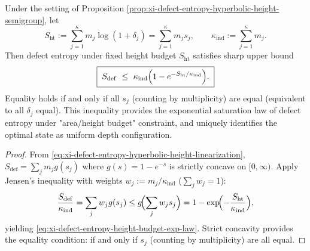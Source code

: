 \begin{corollary}\label{cor:xi-defect-entropy-height-budget-exponential-law}
Under the setting of Proposition \ref{prop:xi-defect-entropy-hyperbolic-height-semigroup}, let
\[
S_{\mathrm{ht}}:=\sum_{j=1}^{\kappa}m_j\log(1+\delta_j)=\sum_{j=1}^{\kappa}m_j s_j,
\qquad
\kappa_{\mathrm{ind}}:=\sum_{j=1}^{\kappa}m_j.
\]
Then defect entropy under fixed height budget \(S_{\mathrm{ht}}\) satisfies sharp upper bound
\begin{equation}\label{eq:xi-defect-entropy-height-budget-exp-law}
\boxed{\;
S_{\mathrm{def}}
\ \le\
\kappa_{\mathrm{ind}}\Bigl(1-e^{-S_{\mathrm{ht}}/\kappa_{\mathrm{ind}}}\Bigr).\;}
\end{equation}
Equality holds if and only if all \(s_j\) (counting by multiplicity) are equal (equivalent to all \(\delta_j\) equal).
This inequality provides the exponential saturation law of defect entropy under "area/height budget" constraint, and uniquely identifies the optimal state as uniform depth configuration.
\end{corollary}
\begin{proof}
From \eqref{eq:xi-defect-entropy-hyperbolic-height-linearization},
\(
S_{\mathrm{def}}=\sum_j m_j g(s_j)
\)
where \(g(s)=1-e^{-s}\) is strictly concave on \([0,\infty)\).
Apply Jensen's inequality with weights \(w_j:=m_j/\kappa_{\mathrm{ind}}\) (\(\sum_j w_j=1\)):
\[
\frac{S_{\mathrm{def}}}{\kappa_{\mathrm{ind}}}
=\sum_j w_j g(s_j)
\le g\!\Bigl(\sum_j w_j s_j\Bigr)
=1-\exp\!\Bigl(-\frac{S_{\mathrm{ht}}}{\kappa_{\mathrm{ind}}}\Bigr),
\]
yielding \eqref{eq:xi-defect-entropy-height-budget-exp-law}.
Strict concavity provides the equality condition: if and only if \(s_j\) (counting by multiplicity) are all equal.
\end{proof}

